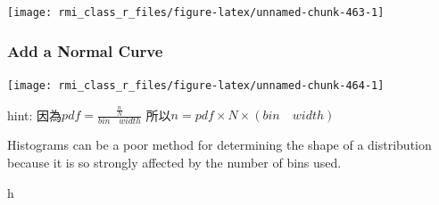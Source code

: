 \documentclass[]{book}
\newenvironment{Shaded}{\begin{snugshade}}{\end{snugshade}}
\newcommand{\DataTypeTok}[1]{\textcolor[rgb]{0.13,0.29,0.53}{#1}}
\newcommand{\DecValTok}[1]{\textcolor[rgb]{0.00,0.00,0.81}{#1}}
\newcommand{\KeywordTok}[1]{\textcolor[rgb]{0.13,0.29,0.53}{\textbf{#1}}}
\newcommand{\NormalTok}[1]{#1}
\newcommand{\OperatorTok}[1]{\textcolor[rgb]{0.81,0.36,0.00}{\textbf{#1}}}
\newcommand{\StringTok}[1]{\textcolor[rgb]{0.31,0.60,0.02}{#1}}
\theoremstyle{definition}
\theoremstyle{definition}
\theoremstyle{definition}
\theoremstyle{remark}
\begin{document}
\begin{center}\texttt{[image: rmi\_class\_r\_files/figure-latex/unnamed-chunk-463-1]} \end{center}

\hypertarget{add-a-normal-curve}{%
\subsubsection{Add a Normal Curve}\label{add-a-normal-curve}}

\begin{Shaded}
\end{Shaded}

\begin{center}\texttt{[image: rmi\_class\_r\_files/figure-latex/unnamed-chunk-464-1]} \end{center}

hint: 因為\(pdf=\frac{\frac{n}{N}}{bin \quad width}\)
所以\(n=pdf\times N \times (bin \quad width)\)

Histograms can be a poor method for determining the shape of a
distribution because it is so strongly affected by the number of bins
used.

\begin{Shaded}
\begin{Highlighting}[]
\NormalTok{h}
\end{Highlighting}
\end{Shaded}
\end{document}
